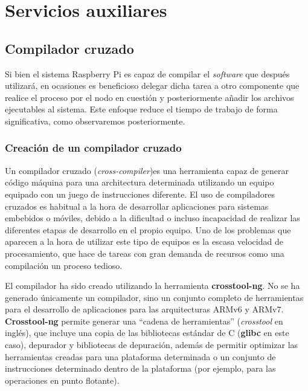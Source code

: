 \chapter{Servicios auxiliares}

\section{Compilador cruzado}

Si bien el sistema Raspberry Pi es capaz de compilar el \textit{software} que después utilizará, en ocasiones es beneficioso delegar dicha tarea a otro componente que realice el proceso por el nodo en cuestión y posteriormente añadir los archivos ejecutables al sistema. Este enfoque reduce el tiempo de trabajo de forma significativa, como observaremos posteriormente.%

\subsection{Creación de un compilador cruzado}

Un compilador cruzado (\textit{cross-compiler})es una herramienta capaz de generar código máquina para una architectura determinada utilizando un equipo equipado con un juego de instrucciones diferente.%
El uso de compiladores cruzados es habitual a la hora de desarrollar aplicaciones para sistemas embebidos o móviles, debido a la dificultad o incluso incapacidad de realizar las diferentes etapas de desarrollo en el propio equipo. Uno de los problemas que aparecen a la hora de utilizar este tipo de equipos es la escasa velocidad de procesamiento, que hace de tareas con gran demanda de recursos como una compilación un proceso tedioso.

El compilador ha sido creado utilizando la herramienta \textbf{crosstool-ng}. No se ha generado únicamente un compilador, sino un conjunto completo de herramientas para el desarrollo de aplicaciones para las arquitecturas ARMv6 y ARMv7. \textbf{Crosstool-ng} permite generar una ``cadena de herramientas'' (\textit{crosstool} en inglés), que incluye una copia de las bibliotecas estándar de C (\textbf{glibc} en este caso), depurador y bibliotecas de depuración, además de permitir optimizar las herramientas creadas para una plataforma determinada o un conjunto de instrucciones determinado dentro de la plataforma (por ejemplo, para las operaciones en punto flotante).

